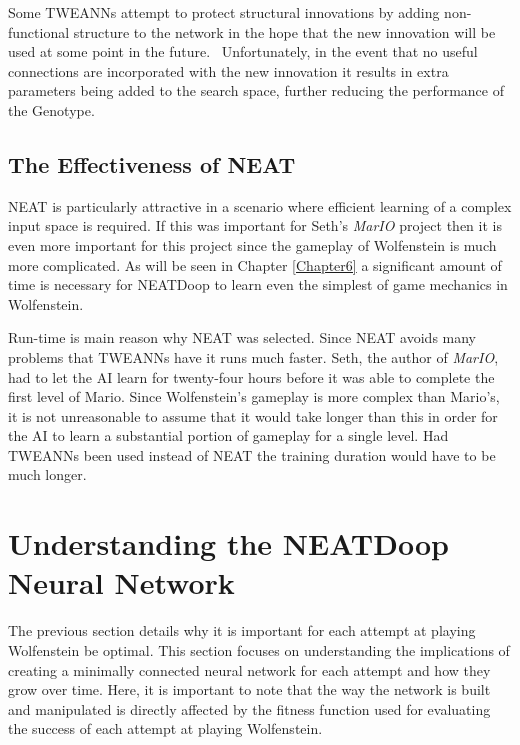 \documentclass[]{Learning-to-Play-Wolfenstein-thesis}
\begin{document}
Some TWEANNs attempt to protect structural innovations by adding non-functional structure to the network in the hope that the new innovation will be used at some point in the future.~\cite{GNARL} Unfortunately, in the event that no useful connections are incorporated with the new innovation it results in extra parameters being added to the search space, further reducing the performance of the Genotype.

\subsection{The Effectiveness of NEAT}
NEAT is particularly attractive in a scenario where efficient learning of a complex input space is required. If this was important for Seth's \textit{MarIO} project then it is even more important for this project since the gameplay of Wolfenstein is much more complicated. As will be seen in Chapter \ref{Chapter6} a significant amount of time is necessary for NEATDoop to learn even the simplest of game mechanics in Wolfenstein. 

Run-time is main reason why NEAT was selected. Since NEAT avoids many problems that TWEANNs have it runs much faster. Seth, the author of \textit{MarIO}, had to let the AI learn for twenty-four hours before it was able to complete the first level of Mario. Since Wolfenstein's gameplay is more complex than Mario's, it is not unreasonable to assume that it would take longer than this in order for the AI to learn a substantial portion of gameplay for a single level. Had TWEANNs been used instead of NEAT the training duration would have to be much longer. 
\section{Understanding the NEATDoop Neural Network}
The previous section details why it is important for each attempt at playing Wolfenstein be optimal. This section focuses on understanding the implications of creating a minimally connected neural network for each attempt and how they grow over time. Here, it is important to note that the way the network is built and manipulated is directly affected by the fitness function used for evaluating the success of each attempt at playing Wolfenstein.
\end{document}
